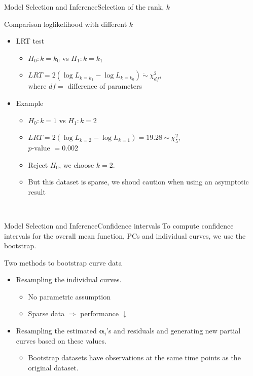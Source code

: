 \documentclass{beamer}
\def \balpha {\boldsymbol{\alpha}}
\begin{document}
\begin{frame}{Model Selection and Inference}{Selection of the rank, $k$}
	\begin{block}{Comparison loglikelihood with different $k$}
		\begin{itemize}
			\item {
				LRT test
			}
			\begin{itemize}
				\item {
					$H_0:k=k_0$ vs $H_1:k=k_1$
				}
				\item {
					$LRT = 2(\log L_{k=k_1} - \log L_{k=k_0}) \ \dot\sim \ \chi^2_{df}$, \\where $df=$ difference of parameters
				}
			\end{itemize}
			\item {
				Example
			}
			\begin{itemize}
				\item {
					$H_0:k=1$ vs $H_1:k=2$
				}
				\item {
					$LRT = 2(\log L_{k=2} - \log L_{k=1}) = 19.28 \ \dot\sim \ \chi^2_5$,\\
					$p$-value $=0.002$
				}
				\item {
					Reject $H_0$, we choose $k=2$.
				}
				\item {
					But this dataset is sparse, we shoud caution when using an asymptotic result
				}
			\end{itemize}
		\end{itemize}
	\end{block}\
\end{frame}

\begin{frame}{Model Selection and Inference}{Confidence intervals}
	To compute confidence intervals for the overall mean function, PCs and individual curves, we use the bootstrap.
	\begin{block}{Two methods to bootstrap curve data}
		\begin{itemize}
			\item {
				Resampling the individual curves.
			}
			\begin{itemize}
				\item {
					No parametric assumption
				}
				\item {
					Sparse data $\Rightarrow$ performance $\downarrow$
				}
			\end{itemize}
			\item {
				Resampling the estimated $\balpha_i$'s and residuals and generating new partial curves based on these values.
			}
			\begin{itemize}
				\item {
					Bootstrap datasets have observations at the same time points as the original dataset.
				}
			\end{itemize}
		\end{itemize}
	\end{block}
\end{frame}
\end{document}
